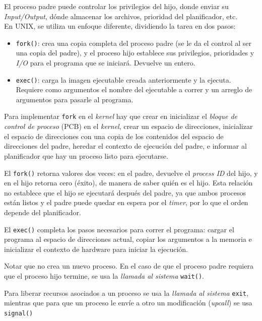 \documentclass[a4paper,10pt,spanish]{article}
\begin{document}
El proceso padre puede controlar los privilegios del hijo, donde enviar su \textit{Input/Output}, dónde almacenar los archivos, prioridad del planificador, etc. \\

En UNIX, se utiliza un enfoque diferente, dividiendo la tarea en dos pasos:

\begin{itemize}
\item \texttt{fork()}: crea una copia completa del proceso padre (se le da el control al ser una copia del padre), y el proceso hijo establece sus privilegios, prioridades y \textit{I/O} para el programa que se iniciará. Devuelve un entero.

\item \texttt{exec()}: carga la imagen ejecutable creada anteriormente y la ejecuta. Requiere como argumentos el nombre del ejecutable a correr y un arreglo de argumentos para pasarle al programa.
\end{itemize}

Para implementar \texttt{fork} en el \textit{kernel} hay que crear en inicializar el \textit{bloque de control de proceso} (PCB) en el \textit{kernel}, crear un espacio de direcciones, inicializar el espacio de direcciones con una copia de los contenidos del  espacio de direcciones del padre, heredar el contexto de ejecución del padre, e informar al planificador que hay un proceso listo para ejecutarse.

El \texttt{fork()} retorna valores dos veces: en el padre, devuelve el \textit{process ID} del hijo, y en el hijo retorna cero (éxito), de manera de saber quién es el hijo. Esta relación no establece que el hijo se ejecutará después del padre, ya que ambos procesos están listos y el padre puede quedar en espera por el \textit{timer}, por lo que el orden depende del planificador.

El \texttt{exec()} completa los pasos necesarios para correr el programa: cargar el programa al espacio de direcciones actual, copiar los argumentos a la memoria e inicializar el contexto de hardware para iniciar la ejecución.

Notar que no crea un nuevo proceso. En el caso de que el proceso padre requiera que el proceso hijo termine, se usa la \textit{llamada al sistema} \texttt{wait()}.

Para liberar recursos asociados a un proceso se usa la \textit{llamada al sistema} \texttt{exit}, mientras que para que un proceso le envíe a otro un modificación (\textit{upcall}) se usa \texttt{signal()}
\end{document}
